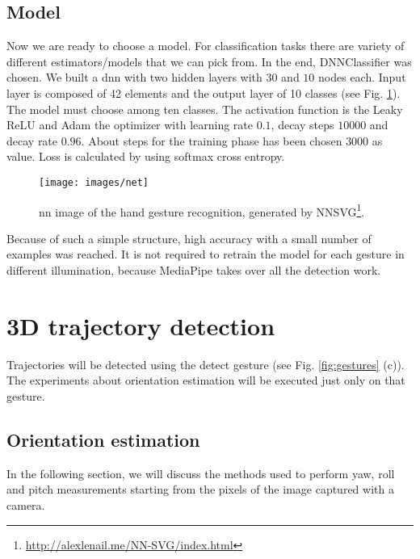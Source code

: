 \subsection{Model}
\label{sec:model}
Now we are ready to choose a model. For classification tasks there are variety of different estimators/models that we can pick from. In the end, DNNClassifier was chosen. We built a \gls{dnn} with two hidden layers with $30$ and $10$ nodes each. Input layer is composed of 42 elements and the output layer of 10 classes (see Fig. \ref{fig:handarch}). The model must choose among ten classes. The activation function is the Leaky ReLU and Adam the optimizer with learning rate $0.1$, decay steps $10000$ and decay rate $0.96$. About steps for the training phase has been chosen $3000$ as value. Loss is calculated by using softmax cross entropy.

\begin{figure}[H]
	\begin{minipage}{\textwidth}
		\centering
		\texttt{[image: images/net]}
		\caption[Hand gesture reconognition \gls{nn}.] {\gls{nn} image of the hand gesture recognition, generated by NNSVG\footnote{\url{http://alexlenail.me/NN-SVG/index.html}}.}
		\label{fig:handarch}
	\end{minipage}
\end{figure}

\noindent Because of such a simple structure,  high accuracy with a small number of examples was reached. It is not required to retrain the model for each gesture in different illumination, because MediaPipe takes over all the detection work.

\section{3D trajectory detection}
\label{sec:3dtraj}
Trajectories will be detected using the detect gesture (see Fig. \ref{fig:gestures} (c)). The experiments about orientation estimation will be executed just only on that gesture. 

\subsection{Orientation estimation}
\label{sec:orientationestimation}
In the following section, we will discuss the methods used to perform yaw, roll and pitch measurements starting from the pixels of the image captured with a camera.

